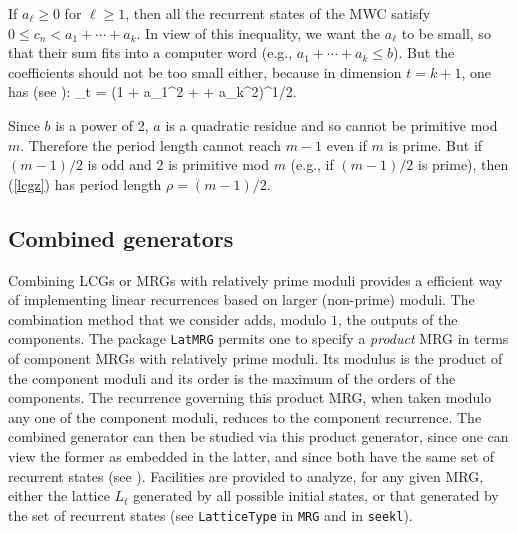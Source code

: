 If $a_\ell \ge 0$ for $\ell\ge 1$, then all the recurrent states 
of the MWC satisfy $0\le c_n < a_1 + \cdots + a_k$.
In view of this inequality, we want the $a_\ell$ to be small,
so that their sum fits into a computer word
(e.g., $a_1 + \cdots + a_k \le b$).
But the coefficients should not be too small either, because
in dimension $t = k+1$, one has (see \cite{rCOU97a}):
\eq
  \ell_t = (1 + a_1^2 + \cdots + a_k^2)^{1/2}.            
\endeq

Since $b$ is a power of 2, $a$ is a quadratic residue and so
cannot be primitive mod $m$.  Therefore the period length cannot
reach $m-1$ even if $m$ is prime.
But if $(m-1)/2$ is odd and 2 is primitive mod $m$
(e.g., if $(m-1)/2$ is prime), then (\ref{lcgz}) has
period length $\rho = (m-1)/2$.

\subsection {Combined generators}

Combining LCGs or MRGs with relatively prime moduli provides a efficient way
of implementing linear recurrences based on larger (non-prime) moduli.
The combination method that we consider adds, modulo $1$, the outputs of the 
components.
The package {\tt LatMRG} permits one to specify a {\em product} 
MRG in terms of component MRGs with relatively prime moduli. 
Its modulus is the product of the component moduli and its order is 
the maximum of the orders of the components. The recurrence governing
this product MRG, when taken modulo any one of the component moduli,
reduces to the component recurrence.
The combined generator can then be studied via this product generator, 
since one can view the former as embedded in the latter, and since
both have the same set of recurrent states (see \cite{rCOU96a}).
Facilities are provided to analyze, for any given MRG, 
either the lattice $L_t$
generated by all possible initial states, or that generated by the set
of recurrent states (see {\tt LatticeType} in {\tt MRG} and in {\tt seekl}).


